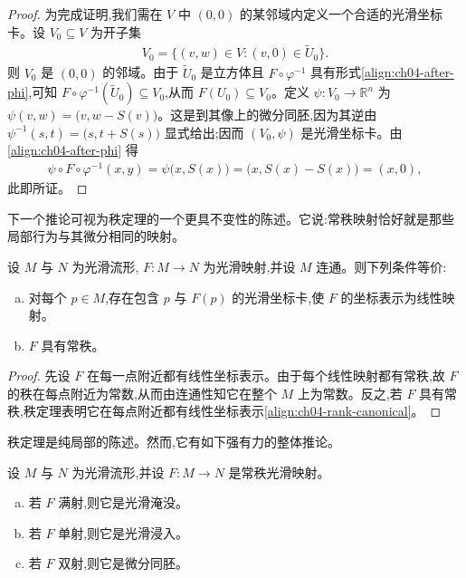 \documentclass[../../main.tex]{subfiles}
\begin{document}
\begin{proof}
为完成证明,我们需在 $V$ 中 $(0,0)$ 的某邻域内定义一个合适的光滑坐标卡。设 $V_0\subseteq V$ 为开子集
\begin{align*}
V_0=\{(v,w)\in V:(v,0)\in\widetilde{U}_0\}.
\end{align*}
则 $V_0$ 是 $(0,0)$ 的邻域。由于 $\widetilde{U}_0$ 是立方体且 $F\circ\varphi^{-1}$ 具有形式\eqref{align:ch04-after-phi},可知 $F\circ\varphi^{-1}(\widetilde{U}_0)\subseteq V_0$,从而 $F(U_0)\subseteq V_0$。定义 $\psi:V_0\to\mathbb{R}^n$ 为 $\psi(v,w)=\bigl(v,w-S(v)\bigr)$。这是到其像上的微分同胚,因为其逆由 $\psi^{-1}(s,t)=\bigl(s,t+S(s)\bigr)$ 显式给出;因而 $(V_0,\psi)$ 是光滑坐标卡。由\eqref{align:ch04-after-phi} 得
\begin{align*}
\psi\circ F\circ\varphi^{-1}(x,y)=\psi\bigl(x,S(x)\bigr)=\bigl(x,S(x)-S(x)\bigr)=(x,0),
\end{align*}
此即所证。
\end{proof}

下一个推论可视为秩定理的一个更具不变性的陈述。它说:常秩映射恰好就是那些局部行为与其微分相同的映射。

\begin{corollary}\label{corollary:ch04-constant-rank-linear}
设 $M$ 与 $N$ 为光滑流形, $F:M\to N$ 为光滑映射,并设 $M$ 连通。则下列条件等价:
\begin{enumerate}[(a)]
\item 对每个 $p\in M$,存在包含 $p$ 与 $F(p)$ 的光滑坐标卡,使 $F$ 的坐标表示为线性映射。
\item $F$ 具有常秩。
\end{enumerate}
\end{corollary}

\begin{proof}
先设 $F$ 在每一点附近都有线性坐标表示。由于每个线性映射都有常秩,故 $F$ 的秩在每点附近为常数,从而由连通性知它在整个 $M$ 上为常数。反之,若 $F$ 具有常秩,秩定理表明它在每点附近都有线性坐标表示\eqref{align:ch04-rank-canonical}。
\end{proof}

秩定理是纯局部的陈述。然而,它有如下强有力的整体推论。

\begin{theorem}\label{theorem:ch04-global-rank}
设 $M$ 与 $N$ 为光滑流形,并设 $F:M\to N$ 是常秩光滑映射。
\begin{enumerate}[(a)]
\item 若 $F$ 满射,则它是光滑淹没。
\item 若 $F$ 单射,则它是光滑浸入。
\item 若 $F$ 双射,则它是微分同胚。
\end{enumerate}
\end{theorem}
\end{document}
